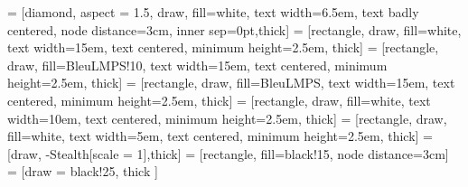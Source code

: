  = [diamond, aspect = 1.5, draw, fill=white, text width=6.5em, text badly centered, node distance=3cm, inner sep=0pt,thick]
 = [rectangle, draw, fill=white, text width=15em, text centered, minimum height=2.5em, thick]
 = [rectangle, draw, fill=BleuLMPS!10, text width=15em, text centered, minimum height=2.5em, thick]
 = [rectangle, draw, fill=BleuLMPS, text width=15em, text centered, minimum height=2.5em, thick]
 = [rectangle, draw, fill=white, text width=10em, text centered, minimum height=2.5em, thick]
 = [rectangle, draw, fill=white, text width=5em, text centered, minimum height=2.5em, thick]
 = [draw, -{Stealth[scale = 1]},thick]
 = [rectangle, fill=black!15, node distance=3cm]
 = [draw = black!25, thick ]

